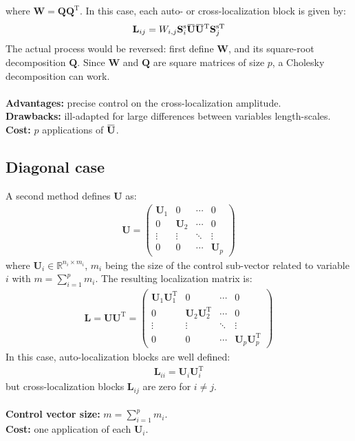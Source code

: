 \documentclass[12pt]{scrartcl}
\newcommand{\overbar}[1]{\mkern 1.5mu\overline{\mkern-1.5mu#1\mkern-1.5mu}\mkern 1.5mu}
\begin{document}
where $\mathbf{W} = \mathbf{Q} \mathbf{Q}^\textrm{T}$. In this case, each auto- or cross-localization block is given by: 
\begin{align}
\mathbf{L}_{ij} = W_{i,j} \mathbf{S}^\mathrm{s}_i \overbar{\mathbf{U}} \overbar{\mathbf{U}}^\mathrm{T} \mathbf{S}_j^{\mathrm{s} \mathrm{T}}
\end{align}
The actual process would be reversed: first define $\mathbf{W}$, and its square-root decomposition $\mathbf{Q}$. Since $\mathbf{W}$ and $\mathbf{Q}$ are square matrices of size $p$, a Cholesky decomposition can work.\\
$  $\\
\textbf{Advantages:} precise control on the cross-localization amplitude.\\
\textbf{Drawbacks:} ill-adapted for large differences between variables length-scales.\\
\textbf{Cost:} $p$ applications of $\overbar{\mathbf{U}}$.

\subsection{Diagonal case}
A second method defines $\mathbf{U}$ as:
\begin{align}
\mathbf{U} = \left( \begin{array}{cccc}
\mathbf{U}_1 & 0 & \cdots & 0 \\
0 & \mathbf{U}_2 & \cdots & 0 \\
\vdots & \vdots & \ddots & \vdots \\
0 & 0 & \cdots & \mathbf{U}_p
\end{array} \right)
\end{align}
where $\mathbf{U}_i \in \mathbb{R}^{n_i \times m_i}$, $m_i$ being the size of the control sub-vector related to variable $i$ with $\displaystyle m = \sum_{i=1}^p m_i$. The resulting localization matrix is:
\begin{align}
\mathbf{L} = \mathbf{U} \mathbf{U}^\mathrm{T} = \left( \begin{array}{cccc}
\mathbf{U}_1 \mathbf{U}_1^\mathrm{T} & 0 & \cdots & 0 \\
0 & \mathbf{U}_2 \mathbf{U}_2^\mathrm{T} & \cdots & 0 \\
\vdots & \vdots & \ddots & \vdots \\
0 & 0 & \cdots & \mathbf{U}_p \mathbf{U}_p^\mathrm{T} 
\end{array} \right)
\end{align}
In this case, auto-localization blocks are well defined:
\begin{align}
\mathbf{L}_{ii} = \mathbf{U}_i \mathbf{U}_i^\mathrm{T}
\end{align}
but cross-localization blocks $\mathbf{L}_{ij}$ are zero for $i \ne j$.\\
$  $\\
\textbf{Control vector size:} $\displaystyle m = \sum_{i=1}^p m_i$.\\
\textbf{Cost:} one application of each $\mathbf{U}_i$.
\end{document}

